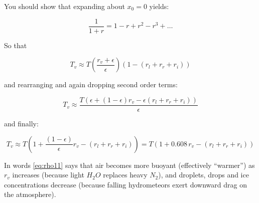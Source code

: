 \documentclass[12pt]{article}
\begin{document}
You should show that expanding about $x_0 = 0$ yields:

\begin{equation}
  \label{eq:expan}
\frac{1}{1 + r} = 1 - r + r^2 - r^3 + \ldots  
\end{equation}

So that


\begin{equation}
  \label{eq:rho9}
 T_v \approx  T \left ( \frac{r_v + \epsilon}{\epsilon} \right ) \left ( 1 - (r_l + r_r + r_i)
 \right )
\end{equation}

and rearranging and again dropping second order terms:

\begin{equation}
  \label{eq:rho10}
 T_v \approx   \frac{T (\epsilon + (1-\epsilon) r_v - \epsilon(r_l + r_r + r_i))}{\epsilon}
\end{equation}

and finally:

\begin{equation}
  \label{eq:rho11}
 T_v \approx   T \left ( 1 + \frac{( 1-\epsilon)}{\epsilon} r_v - (r_l + r_r + r_i) \right )
 = T \left ( 1 + 0.608\, r_v - (r_l + r_r + r_i) \right )
\end{equation}

In words \eqref{eq:rho11} says that air becomes more buoyant (effectively ``warmer'')
as $r_v$ increases (because light $H_2O$ replaces heavy $N_2$), and droplets,
drops and ice concentrations decrease (because falling hydrometeors exert downward
drag on the
atmosphere).
\end{document}

